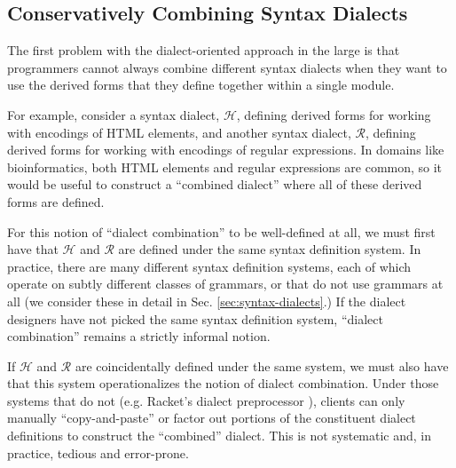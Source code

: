 \subsection{Conservatively Combining Syntax Dialects}
The first problem with the dialect-oriented approach in the large is that programmers cannot always combine different syntax dialects when they want to use the derived forms that they define together within a single module.

For example, consider a syntax dialect, $\mathcal{H}$, defining derived forms for working with encodings of HTML elements, and another syntax dialect, $\mathcal{R}$,  defining derived forms for working with encodings of regular expressions. In domains like bioinformatics, both HTML elements and regular expressions are common, so it would be useful to construct a ``combined dialect'' where all of these derived forms are defined. 

For this notion of ``dialect combination'' to be well-defined at all, we must first have that $\mathcal{H}$ and $\mathcal{R}$ are defined under the same syntax definition system. In practice, there are many different syntax definition systems, each of which operate on subtly different classes of grammars, or that do not use grammars at all (we consider these in detail in Sec. \ref{sec:syntax-dialects}.) If the dialect designers  have not  picked the same syntax definition system, ``dialect combination'' remains a strictly informal notion.%

If $\mathcal{H}$ and $\mathcal{R}$ are coincidentally defined under the same system, we must also have that this system operationalizes the notion of dialect combination. Under those systems that do not (e.g. Racket's dialect preprocessor \cite{Flatt:2012:CLR:2063176.2063195}), clients can only manually  ``copy-and-paste'' or factor out portions of the constituent dialect definitions to construct the ``combined'' dialect. This is not systematic and, in practice, tedious and error-prone.%

